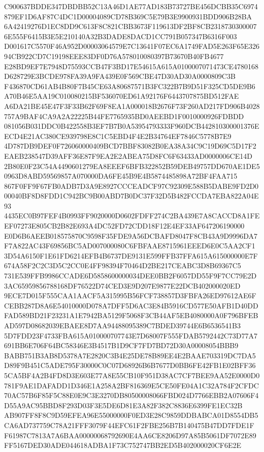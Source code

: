 \documentclass[UTF8,fontset=fandol,zihao=-4,a4paper]{ctexart}
\begin{document}
{{C900637BDDE347DBDBB52C13A46D1AE77AD183B73727BE456DCBB35C6974879EF1D6AF87C4DC1D00004089CD78B369C5E79B3E9900931BDD906B28BA
6A42419276D1EC8DD9C613F8C821CBB3673F119613DF2BF8CB23187303000076E555F6415B3E5E210140A32B3DADE8DACD1CC791B057347B6316F003
D001617C5570F46A952D00003064579E7C13641F07EC6A1749FAD5E263F65E32694CB922CD7C19198EEE83DF0D76A578010080397B73670B40FB4677
E28BD9EF7E7948D75593CCB47F3BD17E54615A615A0100007071473CE4780168D628729E3BCDE978FA39A9FA439E0F569CBE47D30AD30A0000809C3B
F436870CD61AB4B80F7B45CE63A80687571B3FC322B7B9D51F325CD5DE9B6A70B46E5AA19C010080215BF536070ED61A92176F6443707875BD512FAE
A6DA21BE45E47F3F33B62F69F8EA1A000018B2676F73F260AD217FD906B4028757A9BAF4CA9A2A22225B44FE7765935BD0AEEBD1F0010000926FDBDD
081056B031DDC0B422558B3EF7B7B0A53954793333F960DCB442810300001376EECD4E21AC380CE939798E8C1C5EBD4F4E2B34764EF7846C5778B7E9
4D787DB9DEF0F726060000409BCD7BBF83082B0EA38A34C9C19D69C5D17F2EAEB238547D39AFF36E87F9EA2E2ABEA75D8FC6F63433AD0000006CE14D
2B80E0F23C54A4490601279EA8EEEF6BFB322852B59DEB49757DD670AE1DE50963D8ABD59569857A070000DA6FE45B9E4B5874485898A72BF4FAA715
867F0FF9F67FB0ADB7D3A9E8927CCCEADCF97C92309E588B5DABE9FD2D000040BF8D8FDD1C942BC9B00ABD7B0DC37F32D5B482FCCDA7EBA822A04E93
4435EC0B97FEF4B0993FF9020000D0602FDFF274C2BA439E7A8CACCD8A1FEEF07273E805CB2B82E693A4DC52FD72CDD18F12E4EF33AF647206190000
E0D6B6AEEB018575870C9598F35FDE9A56DCBAFD8047F8CB43A9D9996DA7F7A822AC43F69856BC5AD007000080C6FBFAAE8715961EEED6E0C5AA2CF1
3D54A6150F1E61FD6214EFB4B6737DE9131E599FFB37FFA615A615000000E7F674A58F2C2C3D5C2CC0E4FF98394F70464D2BE217CEABC3D8B69367C5
731E539FFB9986CCADE6D5858600000034DEE0BB2F6057DD55F9F7CC79E2D3AC65959856788168DF76522D74CED3E9D207E9877E22DCB402000020ED
9ECE7D015F555CAA1AACF5A315995B56FCF738857D3FBFA26ED97612AE6FCEBB287D8A6E54010000D078A7DFF5D6AC3E84B5916CD577E50AFB1D40DD
FAD589BD21F23231A1E7942BA5129F5068F3CB44AF5EB4080000A0F796BFEBAD597D08682039EBAEE8D7AA94488095389C7BDED39744E6B6536541B3
5D7FDD23F4733FBA615A010000707743E7D68007F555FDAB5792442C73D77A7691BB6E706F64BC58346E3B4517B1D9CF7FD7BD72D30A00008054BBB9
BABB751B3AB8D5378A7E2820C3B4E25DE78B89EE4E2BAAE703319DC7DA5D89F9B451C5ADE795F30000C0C07D68926B6B7677D0BB6FE42FB1E02BFF36
5CA5BF4A2B4FD8D3E603E77A8E55CB10F951D38AC7CF7BEE9AA52E0000D0781F9AE1DAFADD1D346E1A258A2BF816369E5CE50FE04A1C32A784F2CFDC
70AC57B6F85F5C88E0E9C3E3270DB80500008066FBD024D7766EBB2A07606F4D55A9AC95BBD8F293D03F3E5DE6D81E3A82F382C8836E6399FE1EC32B
AB907FF8F8C9D59EFEA96E55000000F0ED3E28C9859DDBABCA01D8554DB5CA6AD737759C78A21FFF3079F44EFC61F2FBE256B7B140475B47DD7FDE1F
F61987C7813A7A6BAA00000068792690E4AA6CE8206D97A85B5061DF7072E89FF5167DED30ADE044618ADBA1F73C752747BB2ED5B402000020CF6E2E
}}
\end{document}

